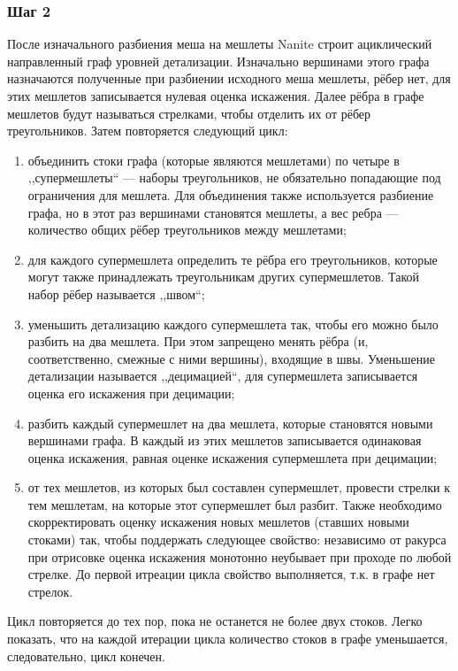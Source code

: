 \subsubsection*{Шаг 2}
После изначального разбиения меша на мешлеты Nanite строит ациклический направленный граф уровней детализации.
Изначально вершинами этого графа назначаются полученные при разбиении исходного меша мешлеты, рёбер нет, для этих мешлетов записывается нулевая оценка искажения.
Далее рёбра в графе мешлетов будут называться стрелками, чтобы отделить их от рёбер треугольников.
Затем повторяется следующий цикл:
\begin{enumerate}
    \item объединить стоки графа (которые являются мешлетами) по четыре в ,,супермешлеты`` --- наборы треугольников, не обязательно попадающие под ограничения для мешлета.
    Для объединения также используется разбиение графа, но в этот раз вершинами  становятся мешлеты, а вес ребра --- количество общих рёбер треугольников между мешлетами;
    \item для каждого супермешлета определить те рёбра его треугольников, которые могут также принадлежать треугольникам других супермешлетов.
    Такой набор рёбер называется ,,швом``;
    \item уменьшить детализацию каждого супермешлета так, чтобы его можно было разбить на два мешлета.
    При этом запрещено менять рёбра (и, соответственно, смежные с ними вершины), входящие в швы.
    Уменьшение детализации называется ,,децимацией``, для супермешлета записывается оценка его искажения при децимации;
    \item разбить каждый супермешлет на два мешлета, которые становятся новыми вершинами графа.
    В каждый из этих мешлетов записывается одинаковая оценка искажения, равная оценке искажения супермешлета при децимации;
    \item от тех мешлетов, из которых был составлен супермешлет, провести стрелки к тем мешлетам, на которые этот супермешлет был разбит.
    Также необходимо скорректировать оценку искажения новых мешлетов (ставших новыми стоками) так, чтобы поддержать следующее свойство: независимо от ракурса при отрисовке оценка искажения монотонно неубывает при проходе по любой стрелке.
    До первой итреации цикла свойство выполняется, т.к. в графе нет стрелок.
\end{enumerate}
Цикл повторяется до тех пор, пока не останется не более двух стоков.
Легко показать, что на каждой итерации цикла количество стоков в графе уменьшается, следовательно, цикл конечен.

